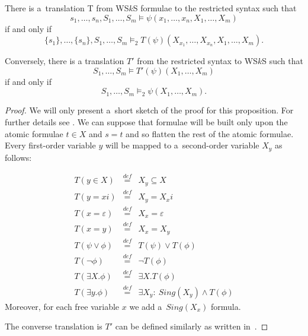 	\begin{prop}
There is a~translation T from WS$k$S formulae to the restricted syntax such that
\begin{equation}
s_1,\ldots,s_n,S_1,\ldots,S_m \models
\psi(x_1,\ldots,x_n,X_1,\ldots,X_m)
\end{equation} if and only if \begin{equation}\{s_1\},\ldots,\{s_n\},S_1,\ldots,S_m \models_2
T(\psi)(X_{x_1},\ldots,X_{x_n}, X_1,\ldots,X_m).
\end{equation}

 Conversely, there is a
translation $T'$ from the restricted syntax to WS$k$S such that \begin{equation}S_1,\ldots,S_m
\models T'(\psi)(X_1,\ldots,X_m)\end{equation} if and only if \begin{equation}S_1,\ldots,S_m \models_2
\psi(X_1,\ldots,X_m).\end{equation}
	\end{prop}
	\begin{proof}
We will only present a~short sketch of the proof for this proposition. For
further details see \cite{tata}.
	\newpage
We can suppose that formulae will be built only upon the atomic formulae $t \in
X$ and $s = t$ and so flatten the rest of the atomic formulae. Every first-order
variable $y$ will be mapped to a~second-order variable $X_y$ as follows:
	
	 \begin{eqnarray}
	 T(y \in X) & \overset{\mathit{def}}{=} & X_y \subseteq X\\
	 T(y = xi) & \overset{\mathit{def}}{=} &  X_y = X_xi\\
	 T(x = \varepsilon) & \overset{\mathit{def}}{=} & X_x = \varepsilon\\
	 T(x = y) & \overset{\mathit{def}}{=} & X_x = X_y\\
	 T(\psi \vee \phi) & \overset{\mathit{def}}{=} & T(\psi) \vee T(\phi)\\
	 T(\neg\phi) & \overset{\mathit{def}}{=} & \neg T(\phi)\\
	 T(\exists X.\phi) & \overset{\mathit{def}}{=} & \exists X.T(\phi)\\
	 T(\exists y.\phi) & \overset{\mathit{def}}{=} & \exists X_y:\ Sing(X_y) \wedge T(\phi)
	 \end{eqnarray}
	Moreover, for each free variable $x$ we add a~$Sing(X_x)$ formula. 
	
	The converse translation is $T'$ can be defined similarly as written
	in~\cite{tata}.
	\end{proof}
	
